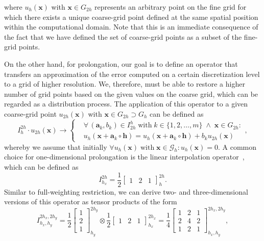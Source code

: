 where $u_h(\bm{x})$ with $\bm{x} \in G_{2h}$ represents an arbitrary point on the fine grid for which there exists a unique coarse-grid point defined at the same spatial position within the computational domain.
Note that this is an immediate consequence of the fact that we have defined the set of coarse-grid points as a subset of the fine-grid points.

On the other hand, for prolongation, our goal is to define an operator that transfers an approximation of the error computed on a certain discretization level to a grid of higher resolution.
We, therefore, must be able to restore a higher number of grid points based on the given values on the coarse grid, which can be regarded as a distribution process.
The application of this operator to a given coarse-grid point $u_{2h}(\bm{x})$ with $\bm{x} \in G_{2h} \supset G_h$ can be defined as
\begin{equation}
	I_{h}^{2h} \cdot u_{2h}(\bm{x}) \rightarrow
	\begin{cases}
		& \forall \, (\bm{a}_k, b_k) \in I_{2h}^{h} \; \text{with} \; k \in \{ 1, 2, \dots, m \} \; \wedge \; \bm{x} \in G_{2h} : \\
		& u_{h}(\bm{x} + \bm{a}_k \circ \bm{h}) = u_{h}(\bm{x} + \bm{a}_k \circ \bm{h}) + b_k u_{2h}(\bm{x}) 
	\end{cases},
	\label{eq:stencil-prolongation application}
\end{equation}
whereby we assume that initially $\forall u_h(\bm{x}) \; \text{with} \; \bm{x} \in \mathcal G_h : u_h(\bm{x}) = 0$.
A common choice for one-dimensional prolongation is the linear interpolation operator~\cite{trottenberg2000multigrid}, which can be defined as
\begin{equation}
	I_{h_x}^{2h} =  \frac{1}{2} \begin{bmatrix}
		1 & 2 & 1
	\end{bmatrix}_{h}^{2h}.
	\label{eq:linear-interpolation}
\end{equation}
Similar to full-weighting restriction, we can derive two- and three-dimensional versions of this operator as tensor products of the form
\begin{equation}
	I_{h_x, h_y}^{2h_x, 2h_y} = \frac{1}{2} \begin{bmatrix}
		1 \\ 2 \\ 1
	\end{bmatrix}_{h_y}^{2h_y} \otimes \frac{1}{2} \begin{bmatrix}
		1 & 2 & 1
	\end{bmatrix}_{h_x}^{2h_x} =
	\frac{1}{4} 
	\begin{bmatrix}
		1 & 2 & 1 \\
		2 & 4 & 2 \\
		1 & 2 & 1
	\end{bmatrix}_{h_x, h_y}^{2h_x, 2h_y},
\end{equation}
